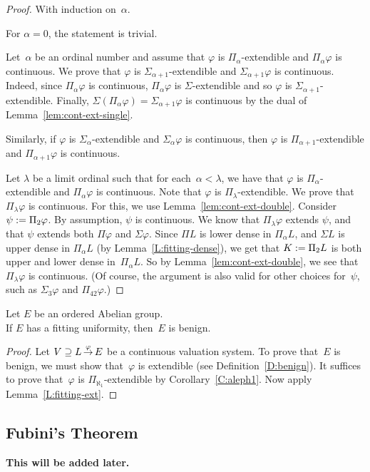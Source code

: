 \documentclass[main.tex]{subfiles}
\begin{document}
\begin{proof}
With induction on~$\alpha$.

\vspace{.3em}
For $\alpha=0$,
the statement is trivial.

\vspace{.3em}
Let~$\alpha$ be an ordinal number
and assume that $\varphi$
is $\Pi_\alpha$-extendible
and $\Pi_\alpha \varphi$ is continuous.
We prove that $\varphi$
is $\Sigma_{\alpha+1}$-extendible
and $\Sigma_{\alpha+1}\varphi$ is continuous.
Indeed,
since $\Pi_\alpha\varphi$ is continuous,
$\Pi_\alpha\varphi$ is $\Sigma$-extendible
and so $\varphi$ is $\Sigma_{\alpha+1}$-extendible.
Finally,
$\Sigma(\Pi_\alpha \varphi)=\Sigma_{\alpha+1}\varphi$
is continuous
by the dual of Lemma~\ref{lem:cont-ext-single}.

Similarly,
if $\varphi$ is $\Sigma_\alpha$-extendible
and $\Sigma_\alpha \varphi$ is continuous,
then $\varphi$
is $\Pi_{\alpha+1}$-extendible
and $\Pi_{\alpha+1}\varphi$ is continuous.

\vspace{.3em}
Let $\lambda$ be a limit ordinal
such that for each~$\alpha<\lambda$,
we have that $\varphi$ is $\Pi_\alpha$-extendible
and $\Pi_\alpha\varphi$ is continuous.
Note that $\varphi$ is $\Pi_\lambda$-extendible.
We prove that $\Pi_\lambda \varphi$ is continuous.
For this,
we use Lemma~\ref{lem:cont-ext-double}.
Consider $\psi := \Pi_2 \varphi$.
By assumption,
$\psi$ is continuous.
We know
that $\Pi_\lambda \varphi$ extends $\psi$,
and that $\psi$ extends both $\Pi\varphi$ and $\Sigma\varphi$.
Since $\Pi L$ is lower dense in $\Pi_\alpha L$,
and $\Sigma L$ is upper dense in $\Pi_\alpha L$
(by Lemma~\ref{L:fitting-dense}),
we get that $K:= \Pi_2 L$ is both upper and lower dense in~$\Pi_\alpha L$.
So by Lemma~\ref{lem:cont-ext-double},
we see that~$\Pi_\lambda\varphi$ is continuous.
(Of course, 
the argument is also valid for other choices for~$\psi$,
such as $\Sigma_3\varphi$ and $\Pi_{42} \varphi$.)
\end{proof}
%
%
\begin{thm}
\label{T:fitting-benign}
Let $E$ be an ordered Abelian group. \\
If $E$ has a fitting uniformity,
then~$E$ is benign.
\end{thm}
\begin{proof}
Let $V \supseteq L\,\smash{\stackrel{\varphi}{\rightarrow}}\,E$ be a continuous valuation system.
To prove that~$E$ is benign,
we must show that~$\varphi$ is extendible
(see Definition~\ref{D:benign}).
It suffices to prove that~$\varphi$ is $\Pi_{\aleph_1}$-extendible
by Corollary~\ref{C:aleph1}.
Now apply Lemma~\ref{L:fitting-ext}.
\end{proof}

%
%
\subsection{Fubini's Theorem}
\textbf{This will be added later.}
\end{document}
